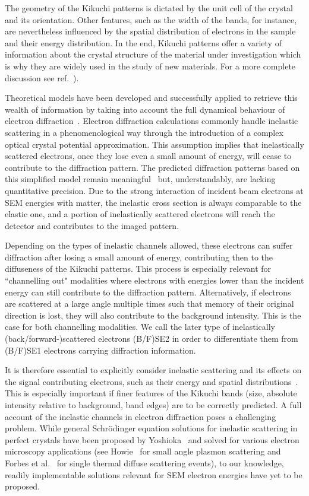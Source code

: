 The geometry of the Kikuchi patterns is dictated by the unit cell of the crystal and its orientation. Other features, such as the width of the bands, for instance, are nevertheless influenced by the spatial distribution of electrons in the sample and their energy distribution. In the end, Kikuchi patterns offer a variety of information about the crystal structure of the material under investigation which is why they are widely used in the study of new materials. For a more complete discussion see ref.~\cite{winkelmann2017}).


Theoretical models have been developed and successfully applied to retrieve this wealth of information by taking into account the full dynamical behaviour of electron diffraction~\cite{winkelmann2007, degraef2014q, singh2016}. Electron diffraction calculations commonly handle inelastic scattering in a phenomenological way through the introduction of a complex optical crystal potential approximation. This assumption implies that inelastically scattered electrons, once they lose even a small amount of energy, will cease to contribute to the diffraction pattern. The predicted diffraction patterns based on this simplified model remain meaningful~\cite{howie1963} but, understandably, are lacking quantitative precision. Due to the strong interaction of incident beam electrons at SEM energies with matter, the inelastic cross section is always comparable to the elastic one, and a portion of inelastically scattered electrons will reach the detector and contributes to the imaged pattern. 

Depending on the types of inelastic channels allowed, these electrons can suffer diffraction after losing a small amount of energy, contributing then to the diffuseness of the Kikuchi patterns. This process is especially relevant for ``channelling out" modalities where electrons with energies lower than the incident energy can still contribute to the diffraction pattern. Alternatively, if electrons are scattered at a large angle multiple times such that memory of their original direction is lost, they will also contribute to the background intensity. This is the case for both channelling modalities. We call the later type of inelastically (back/forward-)scattered electrons (B/F)SE2 in order to differentiate them from (B/F)SE1 electrons carrying diffraction information.

It is therefore essential to explicitly consider inelastic scattering and its effects on the signal contributing electrons, such as their energy and spatial distributions~\cite{degraef2013e, winkelmann2016}. This is especially important if finer features of the Kikuchi bands (size, absolute intensity relative to background, band edges) are to be correctly predicted. A full account of the inelastic channels in electron diffraction poses a challenging problem. While general Schr\"odinger equation solutions for inelastic scattering in perfect crystals have been proposed by Yoshioka~\cite{yoshioka1957a} and solved for various electron microscopy applications (see Howie~\cite{howie1963} for small angle plasmon scattering and Forbes et al.~\cite{forbes2011} for single thermal diffuse scattering events), to our knowledge, readily implementable solutions relevant for SEM electron energies have yet to be proposed.

